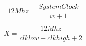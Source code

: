 \documentclass{article}
\begin{document}
\[ 12 Mhz = \frac{System Clock}{iv + 1} \]
\pagebreak

\[ X = \frac{12 Mhz}{clk low + clk high + 2} \]
\pagebreak
\end{document}
